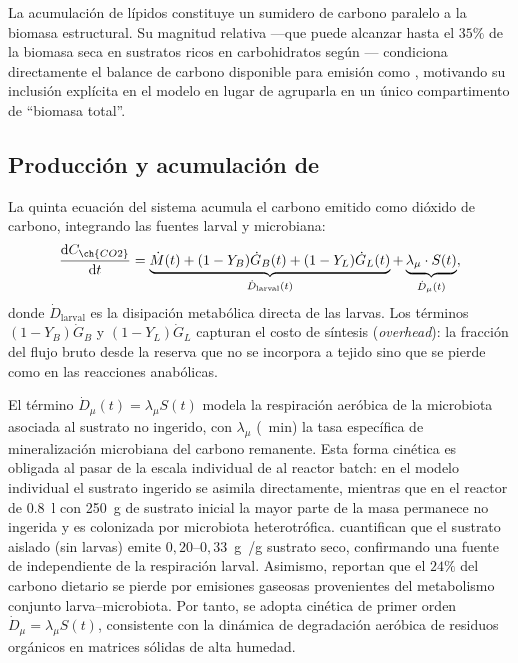 La acumulación de lípidos constituye un sumidero de carbono paralelo a la biomasa estructural. Su magnitud relativa ---que puede alcanzar hasta el $35\%$ de la biomasa seca en sustratos ricos en carbohidratos según \textcite{grausaMetabolicModelingHermetia2023}--- condiciona directamente el balance de carbono disponible para emisión como , motivando su inclusión explícita en el modelo en lugar de agruparla en un único compartimento de ``biomasa total''.

\subsection{Producción y acumulación de \texorpdfstring{}{CO2}}
\label{subsec:cap3_ode_co2}

La quinta ecuación del sistema acumula el carbono emitido como dióxido de carbono, integrando las fuentes larval y microbiana:
\begin{equation}
    \frac{\mathrm{d}C_{\ch{CO2}}}{\mathrm{d}t} = \underbrace{\dot{M}(t) + (1-Y_B)\dot{G}_B(t) + (1-Y_L)\dot{G}_L(t)}_{\dot{D}_{\mathrm{larval}}(t)} + \underbrace{\lambda_{\mu} \cdot S(t)}_{\dot{D}_{\mu}(t)},
    \label{eq:cap3_ode_co2}
\end{equation}
donde $\dot{D}_{\mathrm{larval}}$ es la disipación metabólica directa de las larvas. Los términos $(1-Y_B)\dot{G}_B$ y $(1-Y_L)\dot{G}_L$ capturan el costo de síntesis (\emph{overhead}): la fracción del flujo bruto desde la reserva que no se incorpora a tejido sino que se pierde como  en las reacciones anabólicas.

El término $\dot{D}_{\mu}(t) = \lambda_{\mu} S(t)$ modela la respiración aeróbica de la microbiota asociada al sustrato no ingerido, con $\lambda_{\mu}$ (\si{\per\minute}) la tasa específica de mineralización microbiana del carbono remanente. Esta forma cinética es obligada al pasar de la escala individual de \textcite{eriksenDynamicModellingFeed2022} al reactor batch: en el modelo individual el sustrato ingerido se asimila directamente, mientras que en el reactor de \SI{0,8}{\litre} con \SI{250}{\gram} de sustrato inicial la mayor parte de la masa permanece no ingerida y es colonizada por microbiota heterotrófica. \textcite{rossiEstimatingDynamicsGreenhouse2024a} cuantifican que el sustrato aislado (sin larvas) emite $0{,}20$--$0{,}33$~\si{\gram}~/\si{\gram} sustrato seco, confirmando una fuente de  independiente de la respiración larval. Asimismo, \textcite{parodiBioconversionEfficienciesGreenhouse2020a} reportan que el $24\%$ del carbono dietario se pierde por emisiones gaseosas provenientes del metabolismo conjunto larva--microbiota. Por tanto, se adopta cinética de primer orden $\dot{D}_{\mu}=\lambda_{\mu} S(t)$, consistente con la dinámica de degradación aeróbica de residuos orgánicos en matrices sólidas de alta humedad.

